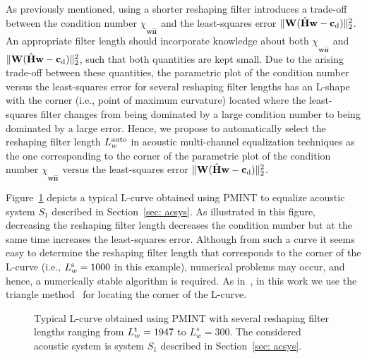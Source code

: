 \documentclass[twocolumn]{bmcart}%
\begin{document}
As previously mentioned, using a shorter reshaping filter introduces a trade-off between the condition number $\chi_{_{\mathbf{W}\hat{\mathbf{H}}}}$ and the least-squares error $\|\mathbf{W}(\hat{\mathbf{H}}\mathbf{w} - \mathbf{c}_{\rm d})\|^2_2$.
An appropriate filter length should incorporate knowledge about both $\chi_{_{\mathbf{W}\hat{\mathbf{H}}}}$ and $\|\mathbf{W}(\hat{\mathbf{H}}\mathbf{w} - \mathbf{c}_{\rm d})\|^2_2$, such that both quantities are kept small.
Due to the arising trade-off between these quantities, the parametric plot of the condition number versus the least-squares error for several reshaping filter lengths has an L-shape with the corner (i.e., point of maximum curvature) located where the least-squares filter changes from being dominated by a large condition number to being dominated by a large error.
Hence, we propose to automatically select the reshaping filter length $L^{\rm auto}_{w}$ in acoustic multi-channel equalization techniques as the one corresponding to the corner of the parametric plot of the condition number $\chi_{_{\mathbf{W}\hat{\mathbf{H}}}}$ versus the least-squares error $\|\mathbf{W}(\hat{\mathbf{H}}\mathbf{w} - \mathbf{c}_{\rm d})\|^2_2$.

Figure~\ref{fig: auto_Lw} depicts a typical L-curve obtained using PMINT to equalize acoustic system $S_1$ described in Section~\ref{sec: acsys}.
As illustrated in this figure, decreasing the reshaping filter length decreases the condition number but at the same time increases the least-squares error.
Although from such a curve it seems easy to determine the reshaping filter length that corresponds to the corner of the L-curve (i.e., $L^{\rm s}_w = 1000$ in this example), numerical problems may occur, and hence, a numerically stable algorithm is required.
As in~\cite{Kodrasi_ITASLP_2013}, in this work we use the triangle method~\cite{Castellanos_2002} for locating the corner of the L-curve.
\begin{figure}[t!]
\centering

\caption{Typical L-curve obtained using PMINT with several reshaping filter lengths ranging from $L^{\rm t}_w = 1947$ to $L^{s}_w = 300$. The considered acoustic system is system $S_1$ described in Section~\ref{sec: acsys}.}
\label{fig: auto_Lw}
\end{figure}
\end{document}

